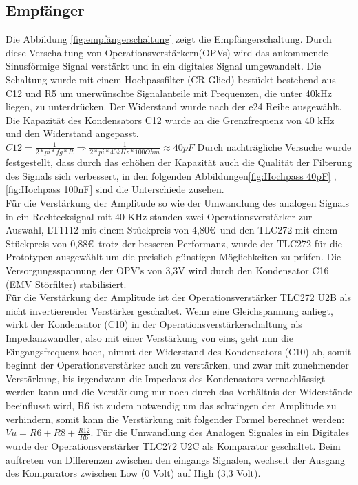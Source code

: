 \subsection{Empfänger}
Die Abbildung \ref{fig:empfängerschaltung} zeigt die Empfängerschaltung. Durch diese Verschaltung von Operationsverstärkern(OPVs) wird das ankommende Sinusförmige Signal verstärkt und in ein digitales Signal umgewandelt. Die Schaltung wurde mit einem Hochpassfilter (CR Glied) bestückt bestehend aus C12 und R5 um unerwünschte Signalanteile mit Frequenzen, die unter 40kHz liegen, zu unterdrücken. Der Widerstand wurde nach der e24 Reihe ausgewählt.
Die Kapazität des Kondensators C12 wurde an die Grenzfrequenz von 40 kHz und den Widerstand angepasst.
\onehalfspacing \\
\(\displaystyle C12=\frac{1}{2*pi*fg*R}\Rightarrow\frac{1}{2*pi*40kHz*100 Ohm}\approx40pF \)
\singlespacing
Durch nachträgliche Versuche wurde festgestellt, dass durch das erhöhen der Kapazität auch die Qualität der Filterung des Signals sich verbessert, in den folgenden Abbildungen\ref{fig:Hochpass 40pF} ,\ref{fig:Hochpass 100nF} sind die Unterschiede zusehen. \\
Für die Verstärkung der Amplitude so wie der Umwandlung des analogen Signals in ein Rechtecksignal mit 40 KHz standen zwei Operationsverstärker zur Auswahl, LT1112 mit einem Stückpreis von 4,80\euro\  und den TLC272 mit einem Stückpreis von 0,88\euro\  trotz der besseren Performanz, wurde der TLC272 für die Prototypen ausgewählt um die preislich günstigen Möglichkeiten zu prüfen. Die Versorgungsspannung der OPV's von 3,3V wird durch den Kondensator C16 (EMV Störfilter) stabilisiert.\\
Für die Verstärkung der Amplitude ist der Operationsverstärker TLC272 U2B als  nicht invertierender Verstärker geschaltet.
Wenn eine Gleichspannung anliegt, wirkt der Kondensator (C10) in der Operationsverstärkerschaltung als Impedanzwandler, also mit einer Verstärkung von eins, geht nun die Eingangsfrequenz hoch, nimmt der Widerstand des Kondensators (C10) ab, somit beginnt der Operationsverstärker auch zu verstärken, und zwar mit zunehmender Verstärkung, bis irgendwann die Impedanz des Kondensators vernachlässigt werden kann und die Verstärkung nur noch durch das Verhältnis der Widerstände beeinflusst wird, R6 ist zudem notwendig um das schwingen der Amplitude zu verhindern, somit kann die Verstärkung mit folgender Formel berechnet werden:
\onehalfspacing \\
\(\displaystyle Vu=R6+R8+\frac{R12}{R6} .\) 
\singlespacing
Für die Umwandlung des Analogen Signales in ein Digitales wurde der Operationsverstärker TLC272 U2C als Komparator geschaltet. Beim auftreten von Differenzen zwischen den eingangs Signalen, wechselt der Ausgang des Komparators zwischen Low (0 Volt) auf High (3,3 Volt).

